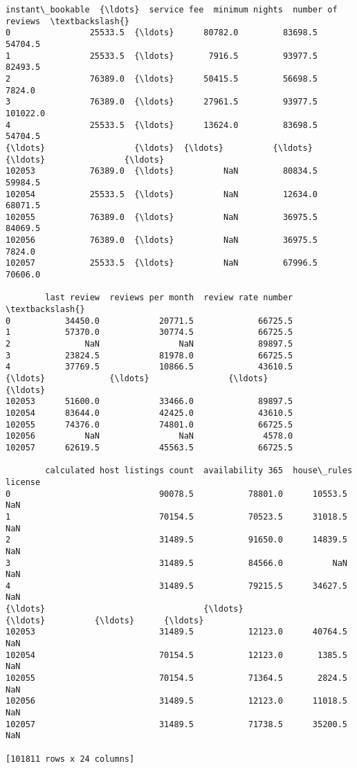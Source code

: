\documentclass[11pt]{article}
\begin{document}
\begin{tcolorbox}[breakable, size=fbox, boxrule=.5pt, pad at break*=1mm, opacityfill=0]
\begin{Verbatim}[commandchars=\\\{\}]
        instant\_bookable  {\ldots}  service fee  minimum nights  number of reviews  \textbackslash{}
0                25533.5  {\ldots}      80782.0         83698.5            54704.5
1                25533.5  {\ldots}       7916.5         93977.5            82493.5
2                76389.0  {\ldots}      50415.5         56698.5             7824.0
3                76389.0  {\ldots}      27961.5         93977.5           101022.0
4                25533.5  {\ldots}      13624.0         83698.5            54704.5
{\ldots}                  {\ldots}  {\ldots}          {\ldots}             {\ldots}                {\ldots}
102053           76389.0  {\ldots}          NaN         80834.5            59984.5
102054           25533.5  {\ldots}          NaN         12634.0            68071.5
102055           76389.0  {\ldots}          NaN         36975.5            84069.5
102056           76389.0  {\ldots}          NaN         36975.5             7824.0
102057           25533.5  {\ldots}          NaN         67996.5            70606.0

        last review  reviews per month  review rate number  \textbackslash{}
0           34450.0            20771.5             66725.5
1           57370.0            30774.5             66725.5
2               NaN                NaN             89897.5
3           23824.5            81978.0             66725.5
4           37769.5            10866.5             43610.5
{\ldots}             {\ldots}                {\ldots}                 {\ldots}
102053      51600.0            33466.0             89897.5
102054      83644.0            42425.0             43610.5
102055      74376.0            74801.0             66725.5
102056          NaN                NaN              4578.0
102057      62619.5            45563.5             66725.5

        calculated host listings count  availability 365  house\_rules  license
0                              90078.5           78801.0      10553.5      NaN
1                              70154.5           70523.5      31018.5      NaN
2                              31489.5           91650.0      14839.5      NaN
3                              31489.5           84566.0          NaN      NaN
4                              31489.5           79215.5      34627.5      NaN
{\ldots}                                {\ldots}               {\ldots}          {\ldots}      {\ldots}
102053                         31489.5           12123.0      40764.5      NaN
102054                         70154.5           12123.0       1385.5      NaN
102055                         70154.5           71364.5       2824.5      NaN
102056                         31489.5           12123.0      11018.5      NaN
102057                         31489.5           71738.5      35200.5      NaN

[101811 rows x 24 columns]
\end{Verbatim}
\end{tcolorbox}
        
\end{document}
